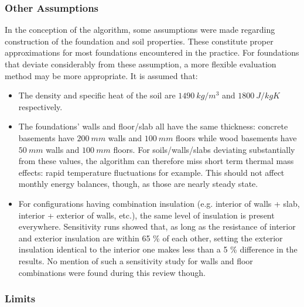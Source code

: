 \subsubsection{Other Assumptions}\label{assumptions-basesimp}

In the conception of the algorithm, some assumptions were made regarding construction of the foundation and soil properties.  These constitute proper approximations for most foundations encountered in the practice.  For foundations that deviate considerably from these assumption, a more flexible evaluation method may be more appropriate.  It is assumed that:
\begin{itemize}
    \item The density and specific heat of the soil are $1490 \: kg/m^3$ and $1800 \: J/kgK$ respectively.
    \item The foundations' walls and floor/slab all have the same thickness: concrete basements have $200 \: mm$ walls and $100 \: mm$ floors while wood basements have $50 \: mm$ walls and $100 \: mm$ floors.
        For soils/walls/slabs deviating substantially from these values, the algorithm can therefore miss short term thermal mass effects: rapid temperature fluctuations for example.  This should not affect monthly energy balances, though, as those are nearly steady state.
    \item For configurations having combination insulation (e.g. interior of walls + slab, interior + exterior of walls, etc.), the same level of insulation is present everywhere.
        Sensitivity runs showed that, as long as the resistance of interior and exterior insulation are within 65 \% of each other, setting the exterior insulation identical to the interior one makes less than a 5 \% difference in the results. No mention of such a sensitivity study for walls and floor combinations were found during this review though.
\end{itemize}

\subsubsection{Limits}\label{limits-basesimp}

